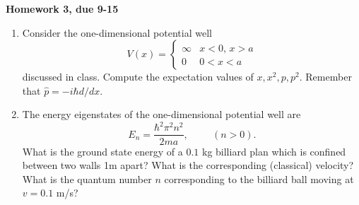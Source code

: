    
\pagestyle{plain}

\centerline{\bf\Large Homework 3, due 9-15}
\vspace*{0.5cm}


\begin{enumerate}

\item{Consider the one-dimensional potential well
\[
V(x) =\left\{ \begin{array}{cl}
  \infty & x<0,\, x>a \\
   0     & 0<x<a
\end{array}\right.
\]
discussed in class. Compute the expectation values 
of $x,x^2,p,p^2$. Remember that $\hat{p}=-i\hbar d/dx$.}

\item{The energy eigenstates of the one-dimensional 
potential well are 
\[
E_n = \frac{\hbar^2\pi^2n^2}{2ma}, \hspace{1cm} (n>0).
\]
What is the ground state energy of a $0.1$ kg billiard 
plan which is confined between two walls 1m apart? What 
is the corresponding (classical) velocity? What is the 
quantum number $n$ corresponding to the billiard ball 
moving at $v=0.1$ m/s?}


\end{enumerate}


   
 

 


  

